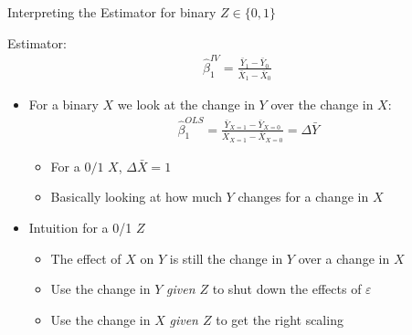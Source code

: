\documentclass[aspectratio=169,11pt]{beamer}
\begin{document}
\begin{frame}{Interpreting the Estimator for binary $Z \in \{0,1\}$}

Estimator:
	\begin{align*}
			\hat\beta_1^{IV} = \frac{\bar Y_1 - \bar Y_0}{\bar X_1 - \bar X_0}
	\end{align*}

\begin{itemize}

	\item For a binary $X$ we look at the change in $Y$ over the change in $X$:
		\begin{align*}
			\hat\beta_1^{OLS} = \frac{\bar Y_{X=1} - \bar Y_{X=0}}{\bar X_{X=1} - \bar X_{X=0}} = \Delta \bar Y
		\end{align*}

	\begin{itemize}
		\item For a $0/1$ $X$, $\Delta \bar X = 1$
		\item Basically looking at how much $Y$ changes for a change in $X$
	\end{itemize}

	\item Intuition for a 0/1 $Z$
		\begin{itemize}
			\item The effect of $X$ on $Y$ is still the change in $Y$ over a change in $X$
			\item Use the change in $Y$ \emph{given $Z$} to shut down the effects of $\varepsilon$
			\item Use the change in $X$ \emph{given $Z$} to get the right scaling
		\end{itemize}
\end{itemize}
\end{frame}
\end{document}

